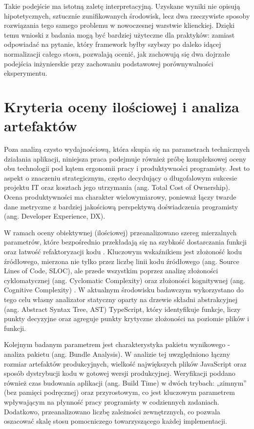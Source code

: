 \documentclass[12pt,openright,twoside]{report}
\begin{document}
Takie podejście ma istotną zaletę interpretacyjną. Uzyskane wyniki nie opisują hipotetycznych, sztucznie zunifikowanych środowisk, lecz dwa rzeczywiste sposoby rozwiązania tego samego problemu w nowoczesnej warstwie klienckiej. Dzięki temu wnioski z badania mogą być bardziej użyteczne dla praktyków: zamiast odpowiadać na pytanie, który framework byłby szybszy po daleko idącej normalizacji całego stosu, pozwalają ocenić, jak zachowują się dwa dojrzałe podejścia inżynierskie przy zachowaniu podstawowej porównywalności eksperymentu.

\section{Kryteria oceny ilościowej i analiza artefaktów}
Poza analizą czysto wydajnościową, która skupia się na parametrach technicznych działania aplikacji, niniejsza praca podejmuje również próbę kompleksowej oceny obu technologii pod kątem ergonomii pracy i produktywności programisty. Jest to aspekt o znaczeniu strategicznym, często decydujący o długofalowym sukcesie projektu IT oraz kosztach jego utrzymania (ang. Total Cost of Ownership). Ocena produktywności ma charakter wielowymiarowy, ponieważ łączy twarde dane metryczne z bardziej jakościową perspektywą doświadczenia programisty (ang. Developer Experience, DX).

W ramach oceny obiektywnej (ilościowej) przeanalizowano szereg mierzalnych parametrów, które bezpośrednio przekładają się na szybkość dostarczania funkcji oraz łatwość refaktoryzacji kodu \cite{Clean_Code_JS, Refactoring_Fowler}. Kluczowym wskaźnikiem jest złożoność kodu źródłowego, mierzona nie tylko przez liczbę linii kodu źródłowego (ang. Source Lines of Code, SLOC), ale przede wszystkim poprzez analizę złożoności cyklomatycznej (ang. Cyclomatic Complexity) oraz złożoności kognitywnej (ang. Cognitive Complexity) \cite{Code_Complete}. W aktualnym środowisku badawczym wykorzystano do tego celu własny analizator statyczny oparty na drzewie składni abstrakcyjnej (ang. Abstract Syntax Tree, AST) TypeScript, który identyfikuje funkcje, liczy punkty decyzyjne oraz agreguje punkty krytyczne złożoności na poziomie plików i funkcji.

Kolejnym badanym parametrem jest charakterystyka pakietu wynikowego - analiza pakietu (ang. Bundle Analysis). W analizie tej uwzględniono łączny rozmiar artefaktów produkcyjnych, wielkość największych plików JavaScript oraz sposób dystrybucji kodu w gotowej wersji produkcyjnej. Weryfikacji poddano również czas budowania aplikacji (ang. Build Time) w dwóch trybach: „zimnym” (bez pamięci podręcznej) oraz przyrostowym, co jest kluczowym parametrem wpływającym na płynność pracy programisty w codziennych zadaniach. Dodatkowo, przeanalizowano liczbę zależności zewnętrznych, co pozwala oszacować skalę stosu pomocniczego towarzyszącego każdej implementacji.
\end{document}
